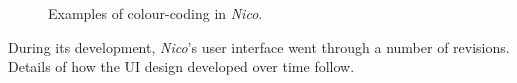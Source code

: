 \documentclass[12pt,twoside,notitlepage,xetex]{report}
\begin{document}
\begin{center}
\begin{figure}[H]
\begin{center}
{}\hspace{2cm}
\end{center}
\caption{Examples of colour-coding in \emph{Nico}.}
\label{fig:ColourCoding}
\end{figure}
\end{center}

During its development, \emph{Nico}'s user interface went through a number of
revisions.  Details of how the UI design developed over time follow.
\end{document}
